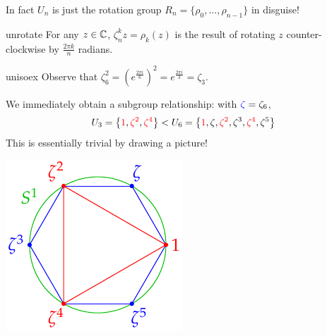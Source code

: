 In fact $U_n$ is just the rotation group $R_n=\{\rho_0,\ldots,\rho_{n-1}\}$ in disguise!

\begin{lemm}{}{unrotate}
For any $z\in \mathbb{C}$, $\zeta_n^kz=\rho_k(z)$ is the result of rotating $z$ counter-clockwise by $\frac{2\pi k}n$ radians.
\end{lemm}

\begin{examples}{}{unisoex}
\exstart Observe that $\zeta_6^2=(e^{\frac{2\pi i}6})^2 =e^{\frac{2\pi i}3} =\zeta_3$.\par

\begin{enumerate}\setcounter{enumi}{1}
	\begin{minipage}[t]{0.7\linewidth}\vspace{0pt}
	\item[]We immediately obtain a subgroup relationship: with $\textcolor{blue}{\zeta}=\zeta_6$, 
	\[U_3=\bigl\{\textcolor{red}{1},\textcolor{red}{\zeta^2},\textcolor{red}{\zeta^4}\bigr\} <U_6=\bigl\{\textcolor{red}{1},\zeta,\textcolor{red}{\zeta^2},\zeta^3,\textcolor{red}{\zeta^4},\zeta^5\bigr\}\]
	This is essentially trivial by drawing a picture!
	\end{minipage}\begin{minipage}[t]{0.3\linewidth}\vspace{-30pt}
		\flushright\includegraphics[scale=0.8]{cyclic-hexagon}
	\end{minipage}
  

\end{enumerate}
\end{examples}
